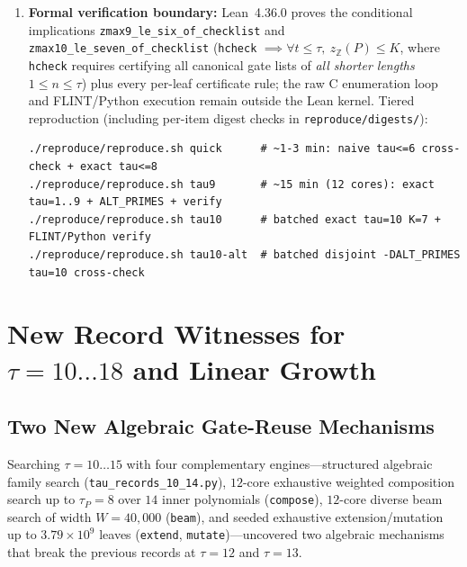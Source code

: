 \documentclass[11pt]{article}
\newcommand{\Z}{\mathbb{Z}}
\newcommand{\code}[1]{\texttt{#1}}
\newcommand{\zZ}{z_{\Z}}
\begin{document}
\begin{enumerate}[label=(\arabic*),leftmargin=1.8em]
  \item \textbf{Formal verification boundary:} Lean~4.36.0 proves the conditional implications \code{zmax9\_le\_six\_of\_checklist} and \code{zmax10\_le\_seven\_of\_checklist} (\code{hcheck} $\implies \forall t \le \tau,\ \zZ(P) \le K$, where \code{hcheck} requires certifying all canonical gate lists of \emph{all shorter lengths} $1 \le n \le \tau$) plus every per-leaf certificate rule; the raw C enumeration loop and FLINT/Python execution remain outside the Lean kernel. Tiered reproduction (including per-item digest checks in \code{reproduce/digests/}):
\begin{verbatim}
./reproduce/reproduce.sh quick      # ~1-3 min: naive tau<=6 cross-check + exact tau<=8
./reproduce/reproduce.sh tau9       # ~15 min (12 cores): exact tau=1..9 + ALT_PRIMES + verify
./reproduce/reproduce.sh tau10      # batched exact tau=10 K=7 + FLINT/Python verify
./reproduce/reproduce.sh tau10-alt  # batched disjoint -DALT_PRIMES tau=10 cross-check
\end{verbatim}
\end{enumerate}

\section{New Record Witnesses for $\tau = 10 \dots 18$ and Linear Growth}\label{sec:records}

\subsection{Two New Algebraic Gate-Reuse Mechanisms}
Searching $\tau = 10 \dots 15$ with four complementary engines---structured algebraic family search (\code{tau\_records\_10\_14.py}), $12$-core exhaustive weighted composition search up to $\tau_P = 8$ over $14$ inner polynomials (\code{compose}), $12$-core diverse beam search of width $W = 40{,}000$ (\code{beam}), and seeded exhaustive extension/mutation up to $3.79 \times 10^9$ leaves (\code{extend}, \code{mutate})---uncovered two algebraic mechanisms that break the previous records at $\tau = 12$ and $\tau = 13$.
\end{document}
